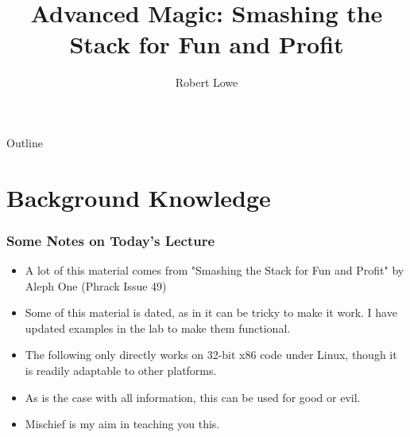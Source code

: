 \documentclass{beamer}
\title{Advanced Magic: Smashing the Stack for Fun and Profit}
\author{Robert Lowe\\}
\institute[Maryville College] %
{
  Division of Mathematics and Computer Science\\
  Maryville College
}
\date[]{}
\begin{document}
\begin{frame}
  \titlepage
\end{frame}

\begin{frame}{Outline}
  \tableofcontents
\end{frame}





\section{Background Knowledge}
\begin{frame}
    \frametitle{Some Notes on Today's Lecture}
    \begin{itemize}[<+->]
        \item A lot of this material comes from "Smashing the Stack for Fun and Profit" by Aleph One (Phrack Issue 49)
        \item Some of this material is dated, as in it can be tricky to make it work.  I have updated examples in the lab to make them functional.
        \item The following only directly works on 32-bit x86 code under Linux, though it is readily adaptable to other platforms.
        \item As is the case with all information, this can be used for good or evil.
        \item Mischief is my aim in teaching you this.
    \end{itemize}
\end{frame}
\end{document}
